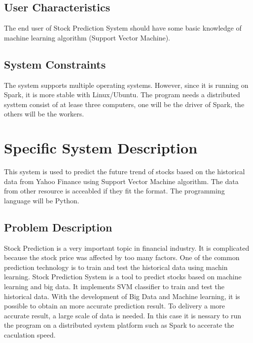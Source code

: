 \documentclass[12pt]{article}
\newcommand{\progname}{Stock Prediction System} %
\begin{document}
\subsection{User Characteristics} \label{SecUserCharacteristics}

The end user of \progname{} should have some basic knowledge of machine learning algorithm (Support Vector Machine).

\subsection{System Constraints}

The system supports multiple operating systems. However, since it is running on
Spark, it is more stable with Linux/Ubuntu. The program needs a distributed
systtem consist of at lease three computers, one will be the driver of Spark,
the others will be the workers.

\section{Specific System Description}

This system is used to predict the future trend of stocks based on the
historical data from Yahoo Finance using Support Vector Machine algorithm. The
data from other resource is acceabled  if they fit the
format. The programming language will be Python.  

\subsection{Problem Description} \label{Sec_pd}

Stock Prediction is a very important topic in financial industry. It is
complicated because the stock price was affected by too many factors. One of the
common prediction technology is to train and test the historical data using
machin  learning.  \progname{} is a tool to predict stocks
based on machine learning and big data. It implements SVM classifier to train
and test the historical data.  With the development of Big Data and Machine
learning, it is possible to obtain an more accurate prediction result.  To
delivery a more accurate result, a large scale of data is needed. In this case
it is nessary  to run the program on a distributed system
platform such as Spark to accerate  the caculation  speed.
\end{document}

